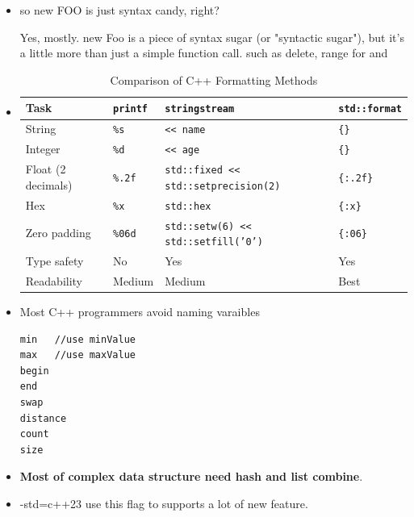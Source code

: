 \documentclass[a4paper,11pt,twoside]{book}
\begin{document}
\begin{itemize}
	\item so new FOO is just syntax candy, right? 
	
	Yes, mostly. new Foo is a piece of syntax sugar (or "syntactic sugar"), but it's a little more than just a simple function call.
	such as delete, range for and 

	\item 
\begin{table}[ht]
\centering
\begin{tabular}{llll}
\toprule
\textbf{Task} & \textbf{\texttt{printf}} & \textbf{\texttt{stringstream}} & \textbf{\texttt{std::format}} \\
\midrule
String             & \texttt{\%s}     & \texttt{<< name}                             & \texttt{\{\}}          \\
Integer            & \texttt{\%d}     & \texttt{<< age}                              & \texttt{\{\}}          \\
Float (2 decimals) & \texttt{\%.2f}   & \texttt{std::fixed << std::setprecision(2)}  & \texttt{\{:.2f\}}      \\
Hex                & \texttt{\%x}     & \texttt{std::hex}                            & \texttt{\{:x\}}        \\
Zero padding       & \texttt{\%06d}   & \texttt{std::setw(6) << std::setfill('0')}   & \texttt{\{:06\}}       \\
Type safety        & No               & Yes                                          & Yes                    \\
Readability        & Medium           & Medium                                       & Best                   \\
\bottomrule
\end{tabular}
\caption{Comparison of C++ Formatting Methods}
\label{tab:format_comparison}
\end{table}


	\item Most C++ programmers avoid naming varaibles
\begin{lstlisting}
min   //use minValue
max   //use maxValue
begin
end
swap
distance
count
size
\end{lstlisting}

	
	\item \textbf{Most of complex data structure need hash and list combine}. 
	
	\item -std=c++23 use this flag to supports a lot of new feature. 
	

\end{itemize}
\end{document}

